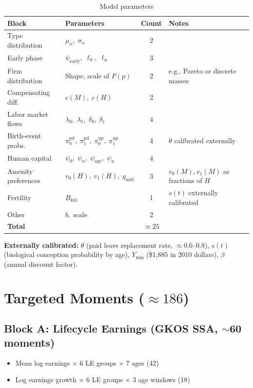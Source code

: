 \documentclass[11pt]{article}
\begin{document}
\begin{table}[h]\centering
\caption{Model parameters}
\begin{tabular}{llcl}
\toprule
Block & Parameters & Count & Notes \\
\midrule
Type distribution & $\mu_\alpha,\; \sigma_\alpha$ & 2 & \\
Early phase & $\psi_{\text{early}},\; \ell_0,\; \ell_\alpha$ & 3 & \\
Firm distribution & Shape, scale of $F(p)$ & 2 & e.g., Pareto or discrete masses \\
Compensating diff. & $c(M),\; c(H)$ & 2 & \\
Labor market flows & $\lambda_0,\; \lambda_1,\; \delta_0,\; \delta_1$ & 4 & \\
Birth-event probs. & $\pi^{\text{pd}}_0,\; \pi^{\text{pd}}_1,\; \pi^{\text{up}}_0,\; \pi^{\text{up}}_1$ & 4 & $\theta$ calibrated externally \\
Human capital & $\psi_0,\; \psi_\alpha,\; \psi_{\text{age}},\; \psi_u$ & 4 & \\
Amenity preferences & $v_0(H),\; v_1(H),\; g_{\text{mid}}$ & 3 & $v_0(M), v_1(M)$ as fractions of $H$ \\
Fertility & $B_{\text{kid}}$ & 1 & $s(t)$ externally calibrated \\
Other & $b,\; \text{scale}$ & 2 & \\
\midrule
\textbf{Total} & & \textbf{$\approx 25$} & \\
\bottomrule
\end{tabular}
\end{table}

\noindent\textbf{Externally calibrated:} $\theta$ (paid leave replacement rate, $\approx 0.6$--$0.8$), $s(t)$ (biological conception probability by age), $Y_{\min}$ (\$1,885 in 2010 dollars), $\beta$ (annual discount factor).

\section{Targeted Moments ($\approx 186$)}

\subsection{Block A: Lifecycle Earnings (GKOS SSA, $\sim$60 moments)}
\begin{itemize}[nosep]
  \item Mean log earnings $\times$ 6 LE groups $\times$ 7 ages \hfill (42)
  \item Log earnings growth $\times$ 6 LE groups $\times$ 3 age windows \hfill (18)
\end{itemize}
\end{document}
